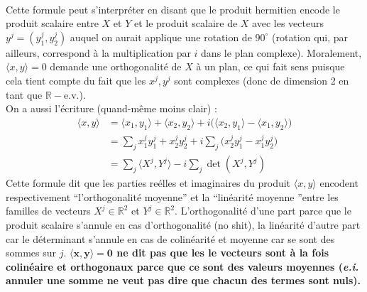 \documentclass[hidelinks, french, oneside]{article}
\newcommand{\R}{\mathbb{R}}
\renewcommand{\bf}[1]{\boldsymbol{#1}}
\theoremstyle{enonce}
\theoremstyle{special}
\theoremstyle{rq}
\theoremstyle{exo}
\theoremstyle{demo}
\begin{document}
\\
Cette formule peut s’interpréter en disant que le produit hermitien encode le produit scalaire entre $X$ et $Y$ et le produit scalaire de $X$ avec les vecteurs $y^j=(y^j_1, y^j_2)$  auquel on aurait applique une rotation de $90^\circ$ (rotation qui, par ailleurs, correspond à la multiplication par $i$ dans le plan complexe). Moralement, $\langle x,y \rangle =0$ demande une orthogonalité de $X$ à un plan, ce qui fait sens puisque cela tient compte du fait que les $x^j, y^j$ sont complexes (donc de dimension 2 en tant que $\R-$e.v.).
\\
On a aussi l'écriture (quand-même moins clair) :
\begin{align*}
\langle x,y \rangle &= \langle x_1, y_1\rangle + \langle x_2, y_2\rangle 
+ i\big(\langle x_2, y_1\rangle - \langle x_1,y_2\rangle\big) \\
	&= \sum_j x^j_1 y^j_1+ x^j_2 y^j_2+ i\sum_j \big( x^j_2 y^j_1 - x^j_1y^j_2 \big) \\
	&= \sum_j \big\langle X^j,Y^j\big\rangle - i\sum_j \det(X^j, Y^j)
\end{align*}
Cette formule dit que les parties reélles et imaginaires du produit $\langle x,y \rangle$ encodent respectivement ``l'orthogonalité moyenne'' et la ``linéarité moyenne ''entre les familles de vecteurs $X^j\in\R^2$ et $Y^j\in\R^2$. L'orthogonalité d'une part parce que le produit scalaire s'annule en cas d'orthogonalité (no shit), la linéarité d'autre part car le déterminant s'annule en cas de colinéarité et moyenne car se sont des sommes sur $j$. \textbf{$\bf{\langle x,y \rangle=0}$ ne dit pas que les le vecteurs sont à la fois colinéaire et orthogonaux parce que ce sont des valeurs moyennes (\textit{e.i.} annuler une somme ne veut pas dire que chacun des termes sont nuls).}
\\
\end{document}
